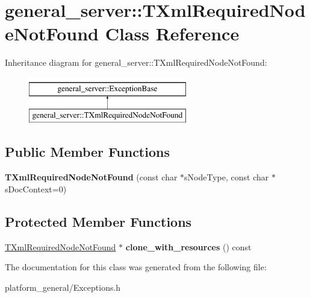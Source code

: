 \hypertarget{classgeneral__server_1_1TXmlRequiredNodeNotFound}{\section{general\-\_\-server\-:\-:\-T\-Xml\-Required\-Node\-Not\-Found \-Class \-Reference}
\label{classgeneral__server_1_1TXmlRequiredNodeNotFound}
}
\-Inheritance diagram for general\-\_\-server\-:\-:\-T\-Xml\-Required\-Node\-Not\-Found\-:\begin{figure}[H]
\begin{center}
\leavevmode
\includegraphics[height=2.000000cm]{classgeneral__server_1_1TXmlRequiredNodeNotFound}
\end{center}
\end{figure}
\subsection*{\-Public \-Member \-Functions}
\begin{DoxyCompactItemize}
\item 
\hypertarget{classgeneral__server_1_1TXmlRequiredNodeNotFound_aee2af0da32d47ee761163efcd86be77a}{{\bfseries \-T\-Xml\-Required\-Node\-Not\-Found} (const char $\ast$s\-Node\-Type, const char $\ast$s\-Doc\-Context=0)}\label{classgeneral__server_1_1TXmlRequiredNodeNotFound_aee2af0da32d47ee761163efcd86be77a}

\end{DoxyCompactItemize}
\subsection*{\-Protected \-Member \-Functions}
\begin{DoxyCompactItemize}
\item 
\hypertarget{classgeneral__server_1_1TXmlRequiredNodeNotFound_ad53127eb38134476c5d7ac296318b17d}{\hyperlink{classgeneral__server_1_1TXmlRequiredNodeNotFound}{\-T\-Xml\-Required\-Node\-Not\-Found} $\ast$ {\bfseries clone\-\_\-with\-\_\-resources} () const }\label{classgeneral__server_1_1TXmlRequiredNodeNotFound_ad53127eb38134476c5d7ac296318b17d}

\end{DoxyCompactItemize}


\-The documentation for this class was generated from the following file\-:\begin{DoxyCompactItemize}
\item 
platform\-\_\-general/\-Exceptions.\-h\end{DoxyCompactItemize}
